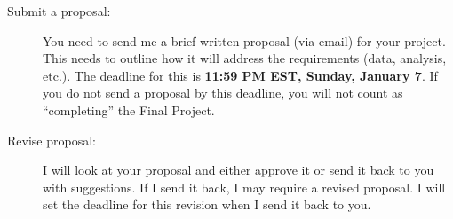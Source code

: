 \documentclass[11pt]{tufte-handout}
\begin{document}
\begin{description}
\item[{Submit a proposal:}]  You need to send me a brief written proposal (via email) for your project. This needs to outline how it will address the requirements (data, analysis, etc.). The deadline for this is \textbf{11:59 PM EST, Sunday, January 7}. If you do not send a proposal by this deadline, you will not count as ``completing'' the Final Project.
\item[{Revise proposal:}] I will look at your proposal and either approve it or send it back to you with suggestions. If I send it back, I may require a revised proposal. I will set the deadline for this revision when I send it back to you.
\end{description}
\newpage
\end{document}
